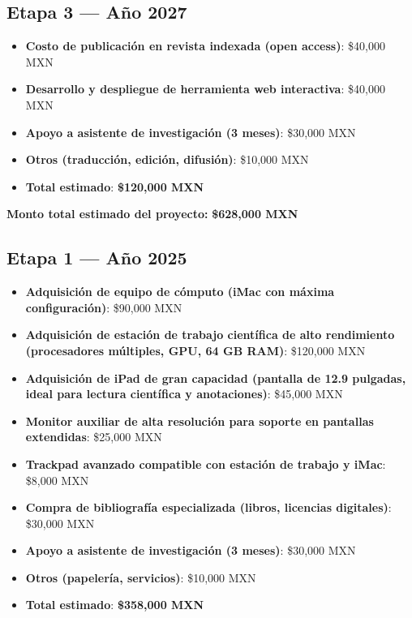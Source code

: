 \documentclass[12pt]{article}
\begin{document}
\subsection*{Etapa 3 — Año 2027}
\begin{itemize}
  \item \textbf{Costo de publicación en revista indexada (open access)}: \$40,000 MXN
  \item \textbf{Desarrollo y despliegue de herramienta web interactiva}: \$40,000 MXN
  \item \textbf{Apoyo a asistente de investigación (3 meses)}: \$30,000 MXN
  \item \textbf{Otros (traducción, edición, difusión)}: \$10,000 MXN
  \item \textbf{Total estimado}: \textbf{\$120,000 MXN}
\end{itemize}

\textbf{Monto total estimado del proyecto:} \textbf{\$628,000 MXN}



\subsection*{Etapa 1 — Año 2025}
\begin{itemize}
  \item \textbf{Adquisición de equipo de cómputo (iMac con máxima configuración)}: \$90,000 MXN
  \item \textbf{Adquisición de estación de trabajo científica de alto rendimiento (procesadores múltiples, GPU, 64 GB RAM)}: \$120,000 MXN
  \item \textbf{Adquisición de iPad de gran capacidad (pantalla de 12.9 pulgadas, ideal para lectura científica y anotaciones)}: \$45,000 MXN
  \item \textbf{Monitor auxiliar de alta resolución para soporte en pantallas extendidas}: \$25,000 MXN
  \item \textbf{Trackpad avanzado compatible con estación de trabajo y iMac}: \$8,000 MXN
  \item \textbf{Compra de bibliografía especializada (libros, licencias digitales)}: \$30,000 MXN
  \item \textbf{Apoyo a asistente de investigación (3 meses)}: \$30,000 MXN
  \item \textbf{Otros (papelería, servicios)}: \$10,000 MXN
  \item \textbf{Total estimado}: \textbf{\$358,000 MXN}
\end{itemize}
\end{document}
